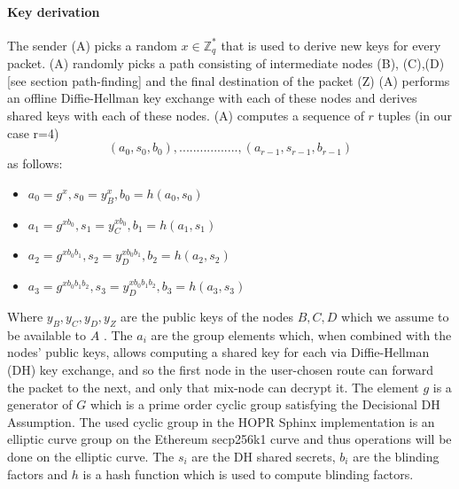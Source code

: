 \paragraph{Key derivation}
The sender (A) picks a random $x\in \mathbb{Z}^*_q$ that is used to derive new keys for every packet. 
\newline (A) randomly picks a path consisting of intermediate nodes (B), (C),(D) [see section path-finding] and the final destination of the packet (Z) 
\newline (A) performs an offline Diffie-Hellman key exchange with each of these nodes and derives shared keys with each of these nodes.
\newline (A) computes a sequence of $r$ tuples (in our case r=4)  $$(a_0,s_0,b_0),.................,(a_{r-1},s_{r-1},b_{r-1})$$ as follows:
\begin{itemize}
\item $a_0=g^x,s_0=y^x_B,b_0=h(a_0,s_0)$
\item $a_1=g^{xb_0},s_1=y^{xb_0}_C,b_1=h(a_1,s_1)$
\item $a_2=g^{xb_0b_1},s_2=y^{xb_0b_1}_D,b_2=h(a_2,s_2)$
\item $a_3=g^{xb_0b_1b_2},s_3=y^{xb_0b_1b_2}_D,b_3=h(a_3,s_3)$
\end{itemize}
 Where $y_B,y_C,y_D,y_Z$ are the public keys of the nodes $B,C, D$  which we assume to be available to $A$ . The $a_i$ are the group elements which, when combined with the nodes’ public keys, allows computing a shared key for each via Diffie-Hellman (DH) key exchange, 
 and so the first node in the user-chosen route can forward the packet to the next, and only that mix-node can decrypt it.
The element $g$ is a generator of $G$ which is a prime order cyclic group satisfying the Decisional DH Assumption. The used cyclic group in the HOPR Sphinx implementation is an elliptic curve group on the Ethereum secp256k1 curve and thus operations will be done on the elliptic curve. The $s_i$ are the DH shared secrets, $b_i$ are the blinding factors and $h$ is a hash function which is used to compute blinding factors.



